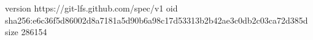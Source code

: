 version https://git-lfs.github.com/spec/v1
oid sha256:e6c36f5d86002d8a7181a5d90b6a98c17d53313b2b42ae3c0db2c03ca72d385d
size 286154
